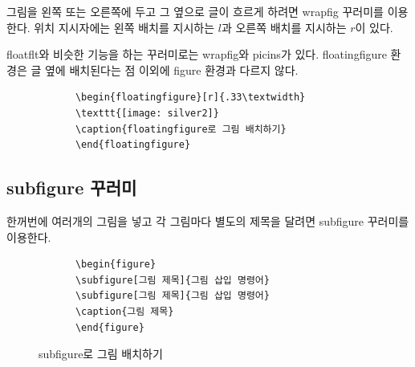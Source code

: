 			그림을 왼쪽 또는 오른쪽에 두고 그 옆으로 글이 흐르게 하려면 wrapfig 꾸러미를 이용한다. 
			위치 지시자에는 왼쪽 배치를 지시하는 $l$과 오른쪽 배치를 지시하는 $r$이 있다.
			
			floatflt와 비슷한 기능을 하는 꾸러미로는 wrapfig와 picins가 있다.
			floatingfigure 환경은 글 옆에 배치된다는 점 이외에 figure 환경과 다르지 않다.
			
			\begin{verbatim}
			\begin{floatingfigure}[r]{.33\textwidth}
			\texttt{[image: silver2]}
			\caption{floatingfigure로 그림 배치하기}
			\end{floatingfigure}
			\end{verbatim}
		
		
		\clearpage
		\subsection{subfigure 꾸러미}
		
			한꺼번에 여러개의 그림을 넣고 각 그림마다 별도의 제목을 달려면 subfigure 꾸러미를 이용한다.
				
			\begin{verbatim}
			\begin{figure}
			\subfigure[그림 제목]{그림 삽입 명령어}
			\subfigure[그림 제목]{그림 삽입 명령어}
			\caption{그림 제목}
			\end{figure}
			\end{verbatim}
		
			\begin{figure}
			\centering
			\hfill
			\hfill
			\caption{subfigure로 그림 배치하기}
			\end{figure}
		
